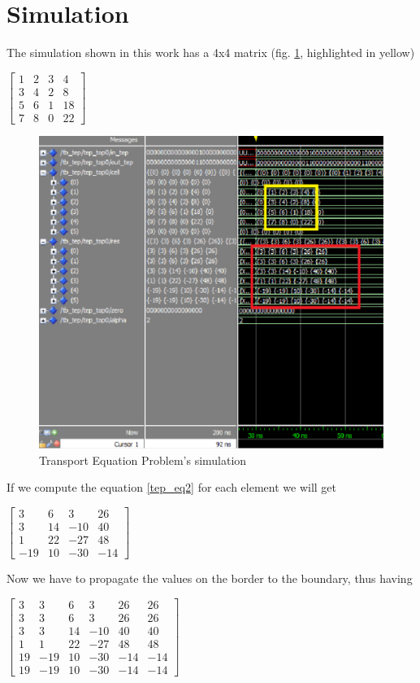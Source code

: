 \clearpage
\newpage
\section{Simulation}
The simulation shown in this work has a 4x4 matrix  (fig. \ref{fig:tep_sim}, highlighted in yellow)
\begin{center}
	$\begin{bmatrix}
	1 & 2& 3&4\\
	3&4&2&8\\
	5&6&1&18\\
	7&8&0&22
	\end{bmatrix}$
\end{center}
\begin{figure}[h!]
	\centering
	\includegraphics[width=\textwidth]{imm/tep/wave_t.png}  
	\caption{Transport Equation Problem's simulation} 
	\label{fig:tep_sim}
\end{figure}
\bigskip
If we compute the equation \ref{tep_eq2} for each element we will get 
\begin{center}
	$\begin{bmatrix}
	3 & 6& 3&26\\
	3&14&-10&40\\
	1&22&-27&48\\
	-19&10&-30&-14
	\end{bmatrix}$
\end{center}
\bigskip
Now we have to propagate the values on the border to the boundary, thus having
\begin{center}
	$\begin{bmatrix}
	3&3 & 6& 3&26&26\\
	3&3 & 6& 3&26&26\\
	3&3&14&-10&40&40\\
	1&1&22&-27&48&48\\
	19&-19&10&-30&-14&-14\\
	19&-19&10&-30&-14&-14
	\end{bmatrix}$
\end{center}
\bigskip
